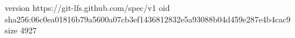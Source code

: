 version https://git-lfs.github.com/spec/v1
oid sha256:06c0ea01816b79a5600a07cb3ef1436812832e5a93088b04d459e287e4b4cac9
size 4927
